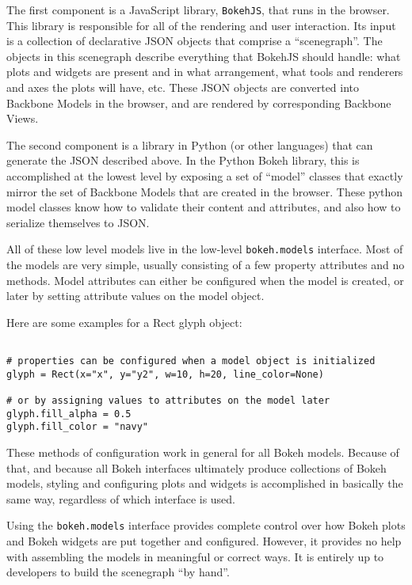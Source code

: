 \documentclass[a4paper,12pt]{article}
\begin{document}
The first component is a JavaScript library, \texttt{BokehJS}, that runs in the browser. This library is responsible for all of the rendering and user interaction. Its input is a collection of declarative JSON objects that comprise a “scenegraph”. The objects in this scenegraph describe everything that BokehJS should handle: what plots and widgets are present and in what arrangement, what tools and renderers and axes the plots will have, etc. These JSON objects are converted into Backbone Models in the browser, and are rendered by corresponding Backbone Views.

The second component is a library in Python (or other languages) that can generate the JSON described above. In the Python Bokeh library, this is accomplished at the lowest level by exposing a set of “model” classes that exactly mirror the set of Backbone Models that are created in the browser. These python model classes know how to validate their content and attributes, and also how to serialize themselves to JSON. 


All of these low level models live in the low-level \texttt{bokeh.models} interface. Most of the models are very simple, usually consisting of a few property attributes and no methods. Model attributes can either be configured when the model is created, or later by setting attribute values on the model object. 

Here are some examples for a Rect glyph object:

\begin{framed}
\begin{verbatim}

# properties can be configured when a model object is initialized
glyph = Rect(x="x", y="y2", w=10, h=20, line_color=None)

# or by assigning values to attributes on the model later
glyph.fill_alpha = 0.5
glyph.fill_color = "navy"
\end{verbatim}
\end{framed}
These methods of configuration work in general for all Bokeh models. Because of that, and because all Bokeh interfaces ultimately produce collections of Bokeh models, styling and configuring plots and widgets is accomplished in basically the same way, regardless of which interface is used.

Using the \texttt{bokeh.models} interface provides complete control over how Bokeh plots and Bokeh widgets are put together and configured. However, it provides no help with assembling the models in meaningful or correct ways. It is entirely up to developers to build the scenegraph “by hand”. 
\end{document}
